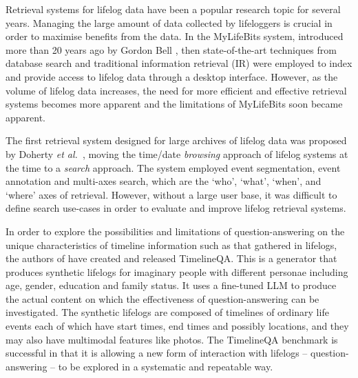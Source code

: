 \documentclass[11pt]{article}
\begin{document}
Retrieval systems for lifelog data have been a popular research topic for several years. Managing the large amount of data collected by lifeloggers is crucial in order to maximise benefits from the data. In the MyLifeBits system, introduced more than 20 years ago by Gordon Bell \cite{10.1145/357489.357513}, then state-of-the-art techniques from database search and traditional information retrieval (IR) were employed to index and provide access to lifelog data through a desktop interface. However, as the volume of lifelog data increases, the need for more efficient and effective retrieval systems  becomes more apparent and the limitations of MyLifeBits soon became apparent. 

The first retrieval system  designed for large archives of lifelog data was proposed by Doherty {\em et al.}~\cite{doherty2012experiences}, moving the time/date \textit{browsing} approach of lifelog systems at the time to a \textit{search} approach. The system employed event segmentation, event annotation and multi-axes search, which are the `who', `what', `when', and `where' axes of retrieval. However, without a large user base, it was difficult to define search use-cases in order to evaluate and improve lifelog retrieval systems. 

In order to explore the possibilities and limitations of question-answering on the unique characteristics of timeline information such as that gathered in lifelogs, the authors of \cite{tan-etal-2023-timelineqa} have created and released TimelineQA. This is a generator that produces synthetic lifelogs for imaginary people with different personae including age, gender, education and family status. It uses a fine-tuned LLM to produce the actual content on which the effectiveness of question-answering can be investigated.  The synthetic lifelogs are composed of timelines of ordinary life events each of which have start times, end times and possibly locations, and they may also have multimodal features like photos. The TimelineQA benchmark is successful in that it is allowing a new form of interaction with lifelogs -- question-answering -- to be explored in a systematic and repeatable way.
\end{document}
